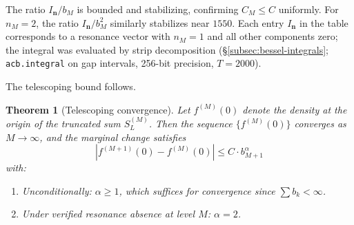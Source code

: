 \documentclass[12pt,reqno]{amsart}
\theoremstyle{plain}
\newtheorem{theorem}{Theorem}[section]
\theoremstyle{definition}
\theoremstyle{remark}
\begin{document}
The ratio $I_{\mathbf{n}}/b_M$ is bounded and stabilizing, confirming $C_M \leq C$ uniformly.  For $n_M = 2$, the ratio $I_{\mathbf{n}}/b_M^2$ similarly stabilizes near $1550$.  Each entry $I_{\mathbf{n}}$ in the table corresponds to a resonance vector with $n_M = 1$ and all other components zero; the integral was evaluated by strip decomposition (\S\ref{subsec:bessel-integrals}; \texttt{acb.integral} on gap intervals, 256-bit precision, $T = 2000$).

The telescoping bound follows.

\begin{theorem}[Telescoping convergence]\label{thm:telescoping_convergence}
Let $f^{(M)}(0)$ denote the density at the origin of the truncated sum $S_L^{(M)}$.  Then the sequence $\{f^{(M)}(0)\}$ converges as $M \to \infty$, and the marginal change satisfies
\[
  |f^{(M+1)}(0) - f^{(M)}(0)| \leq C \cdot b_{M+1}^\alpha
\]
with:
\begin{enumerate}[label=(\roman*)]
  \item Unconditionally: $\alpha \geq 1$, which suffices for convergence since $\sum b_k < \infty$.
  \item Under verified resonance absence at level $M$: $\alpha = 2$.
\end{enumerate}
\end{theorem}
\end{document}
